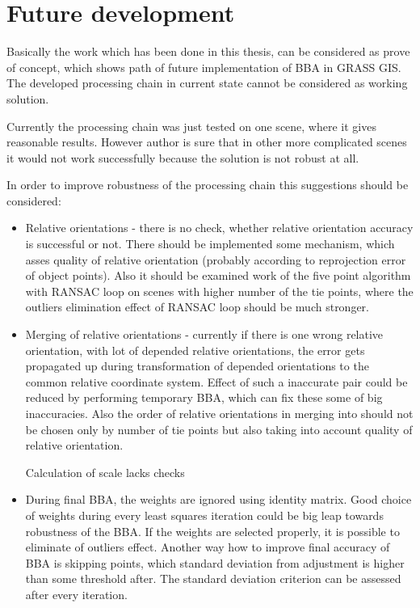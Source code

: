 \documentclass[a4paper,12pt]{article}
\begin{document}
\section{Future development}


Basically the work which has been done in this thesis, can be considered as prove of concept,
which shows path of future implementation of BBA in GRASS GIS. The developed 
processing chain in current state cannot be considered as working solution.

Currently  the processing chain was just tested 
 on one scene, where it gives reasonable results. However 
author is sure that in other more complicated scenes it would not work successfully because 
the solution is not robust at all.

In order to improve robustness of the processing chain this suggestions should be considered:
\begin{itemize}
\item Relative orientations - there is no check, whether relative orientation accuracy is successful or not. There 
should be implemented some mechanism, which asses quality of relative orientation (probably according to reprojection error of object points).
Also it should be examined work of the five point algorithm with RANSAC loop on scenes with higher number of the tie points, where 
the outliers elimination effect of RANSAC loop should be much stronger.
\item  Merging of relative orientations - currently if there is one wrong relative orientation, with lot of depended relative orientations,
the error gets propagated up during transformation of depended orientations to the common relative coordinate system. 
Effect of such a inaccurate pair could be 
reduced by performing  temporary BBA, which can fix these some of big inaccuracies. Also the order of relative orientations in merging 
into  should not 
be chosen only by number of tie points but also taking into account quality of relative orientation.

Calculation of scale lacks checks 

\item During final BBA, the weights are ignored using identity matrix. Good choice of weights during every least squares iteration 
could be big leap towards robustness of the BBA. If the weights are selected properly, it is possible to eliminate of outliers 
effect.
Another way how to improve final accuracy of BBA is skipping points, which 
standard deviation from adjustment is higher than some threshold after. The standard deviation criterion can be assessed 
after every iteration.
\end{itemize}
\end{document}
